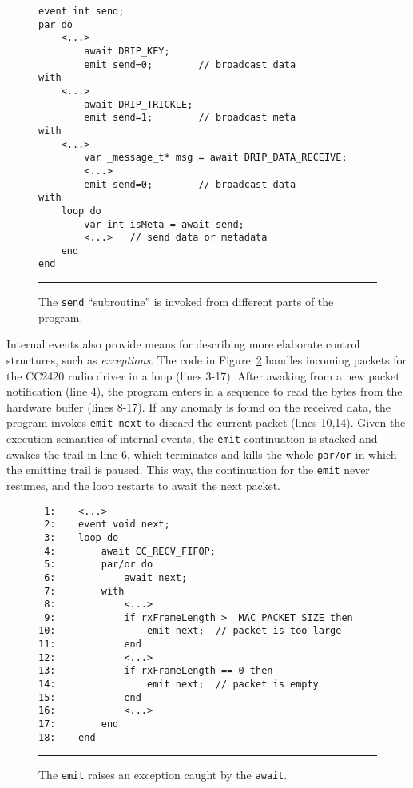 \documentclass[10pt]{sensys-proc}
\newcommand{\code}[1] {{\small{\texttt{#1}}}}
\begin{document}

\begin{figure}[t]
{\small
\begin{verbatim}
event int send;
par do
    <...>
        await DRIP_KEY;
        emit send=0;        // broadcast data
with
    <...>
        await DRIP_TRICKLE;
        emit send=1;        // broadcast meta
with
    <...>
        var _message_t* msg = await DRIP_DATA_RECEIVE;
        <...>
        emit send=0;        // broadcast data
with
    loop do
        var int isMeta = await send;
        <...>   // send data or metadata
    end
end
\end{verbatim}
}
\rule{8.5cm}{0.37pt}
\caption{ The \code{send} ``subroutine'' is invoked from different parts of the 
program.
\label{lst.func}
}
\end{figure}

Internal events also provide means for describing more elaborate control 
structures, such as \emph{exceptions}.
The code in Figure~\ref{lst.exception} handles incoming packets for the CC2420 
radio driver in a loop (lines 3-17).
After awaking from a new packet notification (line 4), the program enters in a 
sequence to read the bytes from the hardware buffer (lines 8-17).
If any anomaly is found on the received data, the program invokes 
\code{emit~next} to discard the current packet (lines 10,14).
Given the execution semantics of internal events, the \code{emit} continuation 
is stacked and awakes the trail in line 6, which terminates and kills the whole 
\code{par/or} in which the emitting trail is paused.
This way, the continuation for the \code{emit} never resumes, and the loop 
restarts to await the next packet.


\begin{figure}[t]
{\small
\begin{verbatim}
 1:    <...>
 2:    event void next;
 3:    loop do
 4:        await CC_RECV_FIFOP;
 5:        par/or do
 6:            await next;
 7:        with
 8:            <...>
 9:            if rxFrameLength > _MAC_PACKET_SIZE then
10:                emit next;  // packet is too large
11:            end
12:            <...>
13:            if rxFrameLength == 0 then
14:                emit next;  // packet is empty
15:            end
16:            <...>
17:        end
18:    end
\end{verbatim}
}
\rule{8.5cm}{0.37pt}
\caption{ The \code{emit} raises an exception caught by the \code{await}.
\label{lst.exception}
}
\end{figure}
\end{document}
